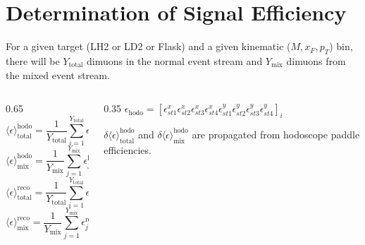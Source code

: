 \documentclass[12pt]{article}
\begin{document}
\section{Determination of Signal Efficiency}

\small
For a given target (LH2 or LD2 or Flask) and a given kinematic ($M, x_F, p_T$) bin, there will be $Y_{\text{total}}$ dimuons in the normal event stream and $Y_{\text{mix}}$ dimuons from the mixed event stream.

\vspace{0.2cm}
\begin{columns}[T]
    \begin{column}{0.65\textwidth}
        \begin{equation*}
            \langle \epsilon \rangle_{\text{total}}^{\text{hodo}} = \frac{1}{Y_{\text{total}}} \sum_{i=1}^{Y_{\text{total}}} \epsilon_i^{\text{hodo}}
        \end{equation*}
        \begin{equation*}
            \langle \epsilon \rangle_{\text{mix}}^{\text{hodo}} = \frac{1}{Y_{\text{mix}}} \sum_{j=1}^{Y_{\text{mix}}} \epsilon_j^{\text{hodo}}
        \end{equation*}
        \begin{equation*}
            \langle \epsilon \rangle_{\text{total}}^{\text{reco}} = \frac{1}{Y_{\text{total}}} \sum_{i=1}^{Y_{\text{total}}} \epsilon_i^{\text{reco}}
        \end{equation*}
        \begin{equation*}
            \langle \epsilon \rangle_{\text{mix}}^{\text{reco}} = \frac{1}{Y_{\text{mix}}} \sum_{j=1}^{Y_{\text{mix}}} \epsilon_j^{\text{reco}}
        \end{equation*}
    \end{column}
    \begin{column}{0.35\textwidth}
        \vspace{0.4cm}
        \scriptsize
        $\epsilon_{\text{hodo}} = [\epsilon_{st1}^x \epsilon_{st2}^x \epsilon_{st3}^x \epsilon_{st4}^x \epsilon_{st1}^y \epsilon_{st2}^y \epsilon_{st3}^y \epsilon_{st4}^y]_i$
        \vspace{0.4cm}
        
        $\delta\langle\epsilon\rangle_{\text{total}}^{\text{hodo}}$ and $\delta\langle\epsilon\rangle_{\text{mix}}^{\text{hodo}}$ are propagated from hodoscope paddle efficiencies.
        \vspace{0.6cm}
        

\end{column}
\end{columns}
\end{document}
